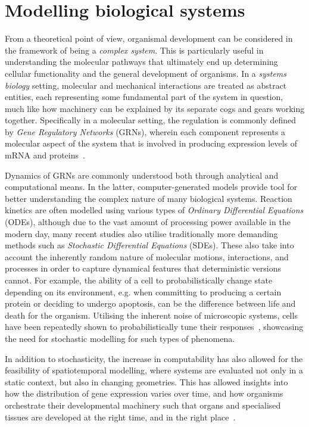 \section{Modelling biological systems} %
\label{sec:modelling}
From a theoretical point of view, organismal development can be
considered in the framework of being a \textit{complex system}. This is
particularly useful in understanding the molecular pathways that ultimately end
up determining cellular functionality and the general development of organisms.
In a \textit{systems biology} setting, molecular and mechanical interactions are
treated as abstract entities, each representing some fundamental part of the
system in question, much like how machinery can be explained by its
separate cogs and gears working together. Specifically in a molecular setting,
the regulation is commonly defined by \textit{Gene Regulatory Networks}
(GRNs), wherein each component represents a molecular aspect of the system
that is involved in producing expression levels of mRNA and
proteins~\cite{kitano2002systems}. 

Dynamics of GRNs are commonly understood both through analytical and
computational means.
In the latter, computer-generated models provide tool for
better understanding the complex nature of many biological systems. 
Reaction kinetics are often modelled using various types of \textit{Ordinary
  Differential Equations} (ODEs), although due to the vast amount of processing
power available in the modern day, many recent studies also utilise
traditionally more demanding methods such as \textit{Stochastic Differential
  Equations} (SDEs). These also take into account the inherently random nature of molecular
motions, interactions, and processes in order to capture dynamical features that
deterministic versions cannot. For example, the ability of a cell to
probabilistically change state depending on its environment, e.g.
when committing to producing a certain protein or deciding to undergo apoptosis,
can be the difference between life and death for the organism. Utilising the
inherent noise of microscopic 
systems, cells have been repeatedly shown to probabilistically tune their
responses~\cite{locke2011stochastic,losick2008stochasticity,mennstochastic},
showcasing the need for stochastic modelling for such types of  
phenomena.

In addition to stochasticity, the increase in computability has also allowed for
the feasibility of spatiotemporal modelling, where systems are evaluated not only
in a static context, but also in changing geometries. This has allowed insights
into how the distribution of gene expression varies over time, and how organisms
orchestrate their developmental machinery such that organs and specialised
tissues are developed at the right time, and in the right place~\cite{ietswaart2015spatiotemporal}. 

